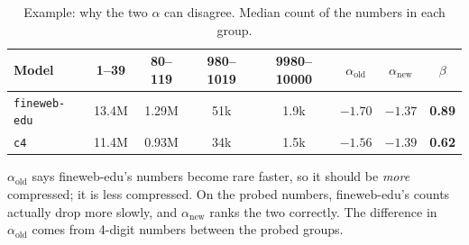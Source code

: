 \documentclass[11pt]{article}
\newcommand{\aold}{\alpha_{\text{old}}}
\newcommand{\anew}{\alpha_{\text{new}}}
\begin{document}
\begin{table}[h]
\centering\small
\caption{Example: why the two $\alpha$ can disagree. Median count of the numbers in each group.}
\label{tab:e11ex}
\begin{tabular}{@{}lcccc ccc@{}}
\toprule
Model & 1--39 & 80--119 & 980--1019 & 9980--10000 & $\aold$ & $\anew$ & $\beta$ \\
\midrule
\texttt{fineweb-edu} & 13.4M & 1.29M & 51k & 1.9k & $-1.70$ & $-1.37$ & \textbf{0.89} \\
\texttt{c4} & 11.4M & 0.93M & 34k & 1.5k & $-1.56$ & $-1.39$ & \textbf{0.62} \\
\bottomrule
\end{tabular}
\end{table}

\noindent $\aold$ says fineweb-edu's numbers become rare faster, so it should be \emph{more}
compressed; it is less compressed. On the probed numbers, fineweb-edu's counts actually drop more
slowly, and $\anew$ ranks the two correctly. The difference in $\aold$ comes from 4-digit numbers
between the probed groups.
\end{document}
